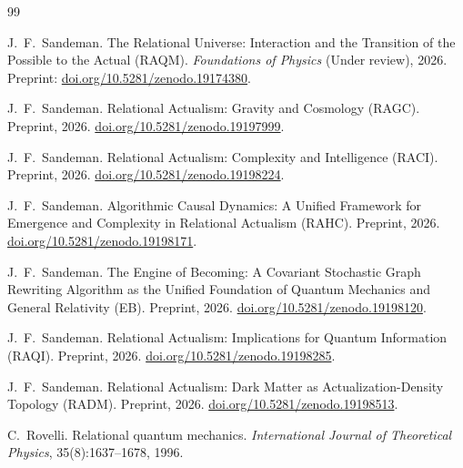 \documentclass[11pt,a4paper]{article}
\theoremstyle{plain}
\theoremstyle{definition}
\theoremstyle{remark}
\begin{document}

\begin{thebibliography}{99}


J.~F.~Sandeman.
\newblock The Relational Universe: Interaction and the Transition of the
  Possible to the Actual ({RAQM}).
\newblock \textit{Foundations of Physics} (Under review), 2026.
\newblock Preprint: \href{https://doi.org/10.5281/zenodo.19174380}{doi.org/10.5281/zenodo.19174380}.

J.~F.~Sandeman.
\newblock Relational Actualism: Gravity and Cosmology ({RAGC}).
\newblock Preprint, 2026.
\newblock \href{https://doi.org/10.5281/zenodo.19197999}{doi.org/10.5281/zenodo.19197999}.

J.~F.~Sandeman.
\newblock Relational Actualism: Complexity and Intelligence ({RACI}).
\newblock Preprint, 2026.
\newblock \href{https://doi.org/10.5281/zenodo.19198224}{doi.org/10.5281/zenodo.19198224}.

J.~F.~Sandeman.
\newblock Algorithmic Causal Dynamics: A Unified Framework for Emergence and
  Complexity in Relational Actualism ({RAHC}).
\newblock Preprint, 2026.
\newblock \href{https://doi.org/10.5281/zenodo.19198171}{doi.org/10.5281/zenodo.19198171}.

J.~F.~Sandeman.
\newblock The Engine of Becoming: A Covariant Stochastic Graph Rewriting
  Algorithm as the Unified Foundation of Quantum Mechanics and General
  Relativity ({EB}).
\newblock Preprint, 2026.
\newblock \href{https://doi.org/10.5281/zenodo.19198120}{doi.org/10.5281/zenodo.19198120}.

J.~F.~Sandeman.
\newblock Relational Actualism: Implications for Quantum Information ({RAQI}).
\newblock Preprint, 2026.
\newblock \href{https://doi.org/10.5281/zenodo.19198285}{doi.org/10.5281/zenodo.19198285}.

J.~F.~Sandeman.
\newblock Relational Actualism: Dark Matter as Actualization-Density Topology
  ({RADM}).
\newblock Preprint, 2026.
\newblock \href{https://doi.org/10.5281/zenodo.19198513}{doi.org/10.5281/zenodo.19198513}.

C.~Rovelli.
\newblock Relational quantum mechanics.
\newblock \textit{International Journal of Theoretical Physics},
  35(8):1637--1678, 1996.


\end{thebibliography}
\end{document}
